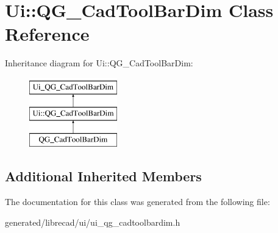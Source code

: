 \hypertarget{classUi_1_1QG__CadToolBarDim}{\section{Ui\-:\-:Q\-G\-\_\-\-Cad\-Tool\-Bar\-Dim Class Reference}
\label{classUi_1_1QG__CadToolBarDim}
}
Inheritance diagram for Ui\-:\-:Q\-G\-\_\-\-Cad\-Tool\-Bar\-Dim\-:\begin{figure}[H]
\begin{center}
\leavevmode
\includegraphics[height=3.000000cm]{classUi_1_1QG__CadToolBarDim}
\end{center}
\end{figure}
\subsection*{Additional Inherited Members}


The documentation for this class was generated from the following file\-:\begin{DoxyCompactItemize}
\item 
generated/librecad/ui/ui\-\_\-qg\-\_\-cadtoolbardim.\-h\end{DoxyCompactItemize}
